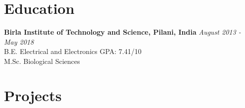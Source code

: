 \documentclass[a4,10pt]{article}
\begin{document}
\section{Education }



{\bf Birla Institute of Technology and Science, Pilani, India} \hfill {\em August 2013 - May 2018} 
\\ B.E. Electrical and Electronics \hfill { GPA: 7.41/10}
\\ M.Sc. Biological Sciences


\section{Projects} %



\end{document}
